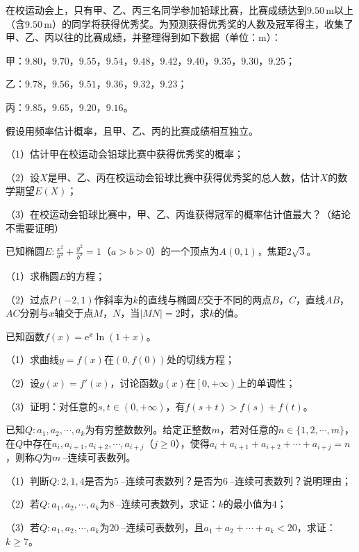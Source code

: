 \documentclass[fontset=founder]{ucedubook}
\begin{document}
\newpageb

\begin{ti}
  在校运动会上，只有甲、乙、丙三名同学参加铅球比赛，比赛成绩达到$9.50\mathrm{\,m}$以上（含$9.50\mathrm{\,m}$）的同学将获得优秀奖。为预测获得优秀奖的人数及冠军得主，收集了甲、乙、丙以往的比赛成绩，并整理得到如下数据（单位：$\mathrm{m}$）：

  甲：$9.80$，$9.70$，$9.55$，$9.54$，$9.48$，$9.42$，$9.40$，$9.35$，$9.30$，$9.25$；
  
  乙：$9.78$，$9.56$，$9.51$，$9.36$，$9.32$，$9.23$；
  
  丙：$9.85$，$9.65$，$9.20$，$9.16$。

  假设用频率估计概率，且甲、乙、丙的比赛成绩相互独立。

  （1）估计甲在校运动会铅球比赛中获得优秀奖的概率；

  （2）设$X$是甲、乙、丙在校运动会铅球比赛中获得优秀奖的总人数，估计$X$的数学期望$E(X)$；

  （3）在校运动会铅球比赛中，甲、乙、丙谁获得冠军的概率估计值最大？（结论不需要证明）
\end{ti}


\newpageb

\begin{ti}
  已知椭圆$E:\frac{x^2}{a^2}+\frac{y^2}{b^2}=1$（$a>b>0$）的一个顶点为$A(0,1)$，焦距$2\sqrt{3}$。

  （1）求椭圆$E$的方程；

  （2）过点$P(-2,1)$作斜率为$k$的直线与椭圆$E$交于不同的两点$B$，$C$，直线$AB$，$AC$分别与$x$轴交于点$M$，$N$，当$\left|MN\right|=2$时，求$k$的值。
\end{ti}


\newpageb

\begin{ti}
  已知函数$f(x)=\mathrm{e}^{x}\ln (1+x)$。

  （1）求曲线$y=f(x)$在$(0,f(0))$处的切线方程；

  （2）设$g(x)=f'(x)$，讨论函数$g(x)$在$\left[0,+\infty\right)$上的单调性；

  （3）证明：对任意的$s,t\in \left(0,+\infty\right)$，有$f(s+t)>f(s)+f(t)$。
\end{ti}


\newpageb

\begin{ti}
  已知$Q:a_1,a_2,\cdots ,a_k$为有穷整数数列。给定正整数$m$，若对任意的$n\in \{1,2,\cdots ,m\}$，在$Q$中存在$a_i,a_{i+1},a_{i+2},\cdots ,a_{i+j}$（$j\ge 0$），使得$a_i+a_{i+1}+a_{i+2}+\cdots +a_{i+j}=n$，则称$Q$为$m\:\!$--连续可表数列。

  （1）判断$Q:2,1,4$是否为$5\:\!$--连续可表数列？是否为$6\:\!$--连续可表数列？说明理由；

  （2）若$Q:a_1,a_2,\cdots ,a_k$为$8\:\!$--连续可表数列，求证：$k$的最小值为$4$；

  （3）若$Q:a_1,a_2,\cdots ,a_k$为$20\:\!$--连续可表数列，且$a_1+a_2+\cdots +a_k<20$，求证：$k\ge 7$。
\end{ti}
\end{document}
